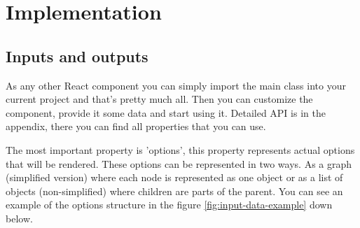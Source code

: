 
\chapter{Implementation} %

\label{Chapter5} %


\section{Inputs and outputs}

As any other React component you can simply import the main class into your current project and that's pretty much all. Then you can customize the component, provide it some data and start using it. Detailed API is in the appendix, there you can find all properties that you can use. 

The most important property is 'options', this property represents actual options that will be rendered. These options can be represented in two ways. As a graph (simplified version) where each node is represented as one object or as a list of objects (non-simplified) where children are parts of the parent. You can see an example of the options structure in the figure \ref{fig:input-data-example} down below.

